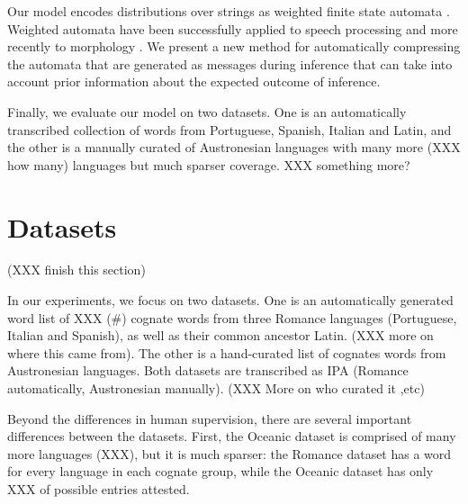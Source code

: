 \documentclass[11pt,a4paper]{article}
\begin{document}
Our model encodes distributions over strings as weighted finite
state automata \cite{mohri09weighted}. Weighted automata have been
successfully applied to speech processing \cite{Mohri96weightedautomata} and
more recently to morphology \cite{dreyer2009graphical}. We present
a new method for automatically compressing the automata that are
generated as messages during inference that can take into account
prior information about the expected outcome of inference.

Finally, we evaluate our model on two datasets. One is an automatically
transcribed collection of words from Portuguese, Spanish, Italian
and Latin, and the other is a manually curated of Austronesian
languages with many more (XXX how many) languages but much sparser
coverage. XXX something more?

\section{Datasets}

(XXX finish this section)

In our experiments, we focus on two datasets. One is an automatically
generated word list of XXX (\#) cognate words from three Romance
languages (Portuguese, Italian and Spanish), as well as their common
ancestor Latin. (XXX more on where this came from). The other is a
hand-curated list of cognates words from Austronesian languages.
Both datasets are transcribed as IPA (Romance automatically,
Austronesian manually). (XXX More on who curated it ,etc)

Beyond the differences in human supervision, there are several
important differences between the datasets. First, the Oceanic
dataset is comprised of many more languages (XXX), but it is much
sparser: the Romance dataset has a word for every language in each
cognate group, while the Oceanic dataset has only XXX of possible
entries attested.
\end{document}
